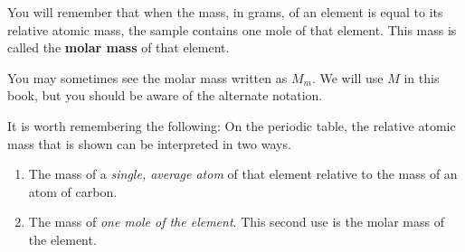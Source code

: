       \label{m38717*id276429}You will remember that when the mass, in grams, of an element is equal to its relative atomic mass, the sample contains one mole of that element. This mass is called the \textbf{molar mass} of that element.\par 
      \label{m38717*eip-277}You may sometimes see the molar mass written as \begin{math}{M}_{m}\end{math}. We will use \begin{math}M\end{math} in this book, but you should be aware of the alternate notation.\par \label{m38717*id276445}It is worth remembering the following: On the periodic table, the relative atomic mass that is shown can be interpreted in two ways.\par 
      \label{m38717*id276451}\begin{enumerate}[noitemsep, label=\textbf{\arabic*}. ] 
            \label{m38717*uid9}\item The mass of a \textsl{single, average atom} of that element relative to the mass of an atom of carbon.
\label{m38717*uid10}\item The mass of \textsl{one mole of the element}. This second use is the molar mass of the element.
\end{enumerate}
        
      
    
      
    
    \setlength\mytablespace{8\tabcolsep}
    \addtolength\mytablespace{5\arrayrulewidth}
    \setlength\mytablewidth{\linewidth}
        
